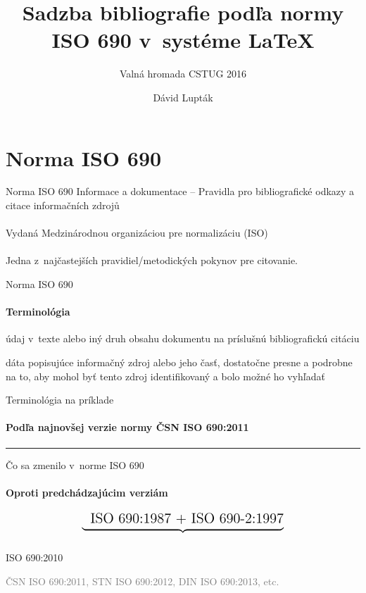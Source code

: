 \documentclass{beamer}
\author{Dávid Lupták}
\title{Sadzba bibliografie podľa normy ISO 690 v~systéme LaTeX}
\subtitle{Valná hromada CSTUG 2016}
\begin{document}
\frame{\titlepage}
\frame{\tableofcontents}

\section{Norma ISO 690}

\begin{frame}{Norma ISO 690}
Informace a dokumentace -- Pravidla pro bibliografické odkazy a citace informačních zdrojů
\\
\\
Vydaná Medzinárodnou organizáciou pre normalizáciu (ISO)
\\
\\
Jedna z~najčastejších pravidiel/metodických pokynov pre citovanie.
\end{frame}

\begin{frame}{Norma ISO 690}
\framesubtitle{Terminológia}
\begin{description}[citácia]
\item[odkaz] údaj v~texte alebo iný druh obsahu dokumentu na príslušnú bibliografickú citáciu
\item[citácia] dáta popisujúce informačný zdroj alebo jeho časť, dostatočne presne a podrobne na to, aby mohol byť tento zdroj identifikovaný a bolo možné ho vyhľadať
\end{description}
\end{frame}

\begin{refsection} %
\begin{frame}{Terminológia na príklade}
\framesubtitle{Podľa najnovšej verzie normy ČSN ISO 690:2011}
\rule{\textwidth}{0.2pt}
\printbibliography
\end{frame}
\end{refsection}

\begin{frame}{Čo sa zmenilo v~norme ISO 690}
\framesubtitle{Oproti predchádzajúcim verziám}
\[
\underbrace{\phantom{\text{-2}}\strut\text{\Large{ISO 690:1987 + ISO 690-2:1997}}}_\text{}
\]
\begin{center}
\LARGE{ISO 690:2010}
\end{center}
\begin{center}
\textcolor{Gray}{ČSN ISO 690:2011, STN ISO 690:2012, DIN ISO 690:2013, etc.}
\end{center}
\end{frame}
\end{document}
